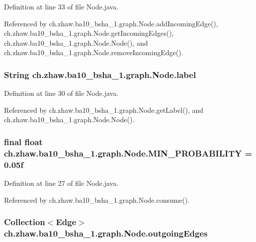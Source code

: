 Definition at line 33 of file Node.java.

Referenced by ch.zhaw.ba10\_\-bsha\_\-1.graph.Node.addIncomingEdge(), ch.zhaw.ba10\_\-bsha\_\-1.graph.Node.getIncomingEdges(), ch.zhaw.ba10\_\-bsha\_\-1.graph.Node.Node(), and ch.zhaw.ba10\_\-bsha\_\-1.graph.Node.removeIncomingEdge().\hypertarget{classch_1_1zhaw_1_1ba10__bsha__1_1_1graph_1_1Node_a02527090afc270a47397d31fedb70375}{
\subsubsection[{label}]{\setlength{\rightskip}{0pt plus 5cm}String {\bf ch.zhaw.ba10\_\-bsha\_\-1.graph.Node.label}}}
\label{classch_1_1zhaw_1_1ba10__bsha__1_1_1graph_1_1Node_a02527090afc270a47397d31fedb70375}


Definition at line 30 of file Node.java.

Referenced by ch.zhaw.ba10\_\-bsha\_\-1.graph.Node.getLabel(), and ch.zhaw.ba10\_\-bsha\_\-1.graph.Node.Node().\hypertarget{classch_1_1zhaw_1_1ba10__bsha__1_1_1graph_1_1Node_abb4e5408b8e351e07fab48d8f45ee50d}{
\subsubsection[{MIN\_\-PROBABILITY}]{\setlength{\rightskip}{0pt plus 5cm}final float {\bf ch.zhaw.ba10\_\-bsha\_\-1.graph.Node.MIN\_\-PROBABILITY} = 0.05f}}
\label{classch_1_1zhaw_1_1ba10__bsha__1_1_1graph_1_1Node_abb4e5408b8e351e07fab48d8f45ee50d}


Definition at line 27 of file Node.java.

Referenced by ch.zhaw.ba10\_\-bsha\_\-1.graph.Node.consume().\hypertarget{classch_1_1zhaw_1_1ba10__bsha__1_1_1graph_1_1Node_a130b2d1b8b68b2fe91d3753b23c766e2}{
\subsubsection[{outgoingEdges}]{\setlength{\rightskip}{0pt plus 5cm}Collection$<${\bf Edge}$>$ {\bf ch.zhaw.ba10\_\-bsha\_\-1.graph.Node.outgoingEdges}}}
\label{classch_1_1zhaw_1_1ba10__bsha__1_1_1graph_1_1Node_a130b2d1b8b68b2fe91d3753b23c766e2}


